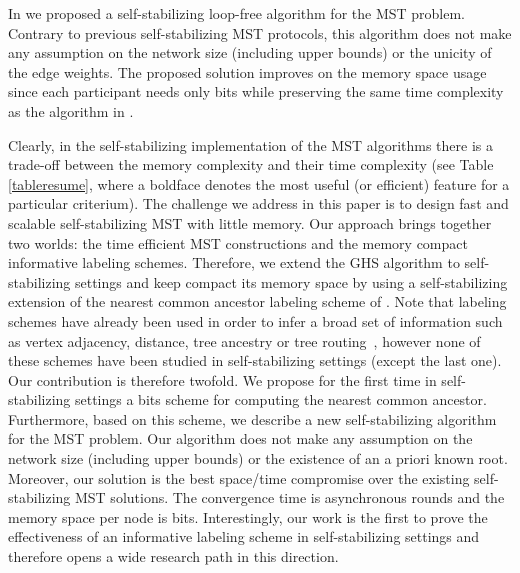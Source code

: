 \documentclass[11pt,a4paper]{article}
\begin{document}
In \cite{BPRT09c} we proposed a  self-stabilizing loop-free algorithm for the MST problem. 
Contrary to previous self-stabilizing MST protocols, this algorithm does not make
any assumption on the network size (including upper bounds) or the unicity of the
edge weights. The proposed solution improves on the memory space usage since each
participant needs only  bits while preserving the same time complexity as the algorithm in \cite{HighamL01}.  

Clearly, in the self-stabilizing implementation of the MST algorithms there is a trade-off between 
the memory complexity and their time complexity (see Table \ref{tableresume}, where a boldface denotes the most useful (or efficient) feature for a particular criterium). The challenge we address in this paper is to design fast 
and scalable self-stabilizing MST with little memory. Our approach brings together two worlds: the time efficient 
MST constructions and the memory compact informative labeling schemes. 
Therefore, we extend
the GHS algorithm to self-stabilizing settings and keep compact its 
memory space by using a self-stabilizing extension 
of the nearest common ancestor labeling scheme of \cite{AGKR02}.
Note that labeling schemes have already been used in 
order to infer a broad set of information such as
vertex adjacency, distance, tree ancestry or tree routing~\cite{BeinDV05},  
however none of these schemes have been studied in self-stabilizing
settings (except the last one).\\







Our contribution is therefore twofold. 
We propose for the first time in self-stabilizing settings a  bits 
scheme for computing the nearest common ancestor. 
Furthermore, based on this scheme, we describe a new 
self-stabilizing algorithm for the MST
problem. Our algorithm does not make any assumption on the network size
(including upper bounds) or the existence of an a priori known root. Moreover,
our solution is the best space/time compromise over the existing self-stabilizing MST solutions.
The convergence time is  asynchronous rounds 
and the memory space per node is 
 bits. Interestingly, our work is the first to prove the effectiveness 
of an informative labeling scheme in self-stabilizing settings and therefore 
opens a wide research path in this direction.   
 
\end{document}
